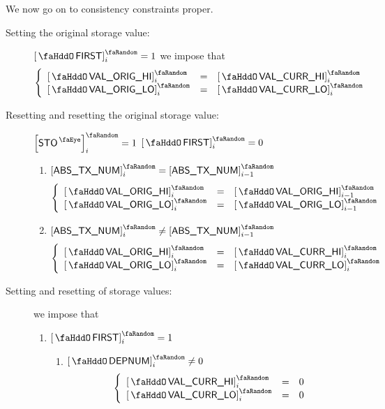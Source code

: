We now go on to consistency constraints proper.
\begin{description}
	\item[Setting the original storage value:]
		\If $\stoFirst_{i} = 1$ \Then
		we impose that
		\[
			\left\{ \begin{array}{lcl}
				\order{\stoOrigValueHi}_{i} & = & \order{\stoCurrValueHi}_{i} \\
				\order{\stoOrigValueLo}_{i} & = & \order{\stoCurrValueLo}_{i} \\
			\end{array} \right.
		\]
	\item[Resetting and resetting the original storage value:]
		\If $\order{\peekStorage}_{i} = 1$ \et $\stoFirst_{i} = 0$ \Then
		\begin{enumerate}
			\item \If $\order{\absTxNum}_{i} =    \order{\absTxNum}_{i - 1}$ \Then
				\[
					\left\{ \begin{array}{lcl}
						\order{\stoOrigValueHi}_{i} & = & \order{\stoOrigValueHi}_{i - 1} \\
						\order{\stoOrigValueLo}_{i} & = & \order{\stoOrigValueLo}_{i - 1} \\
					\end{array} \right.
				\]
			\item \If $\order{\absTxNum}_{i} \neq \order{\absTxNum}_{i - 1}$ \Then
				\[
					\left\{ \begin{array}{lcl}
						\order{\stoOrigValueHi}_{i} & = & \order{\stoCurrValueHi}_{i} \\
						\order{\stoOrigValueLo}_{i} & = & \order{\stoCurrValueLo}_{i} \\
					\end{array} \right.
				\]
		\end{enumerate}
	\item[Setting and resetting of storage values:]
		we impose that
		\begin{enumerate}
			\item \If $\stoFirst_{i} = 1$ \Then
				\begin{enumerate}
					\item \If $\order{\stoDeploymentNumber}_{i} \neq 0$ \Then
						\[
							\left\{ \begin{array}{lcl}
								\order{\stoCurrValueHi}_{i} & = & 0 \\
								\order{\stoCurrValueLo}_{i} & = & 0 \\
							\end{array} \right.
\]
\end{enumerate}
\end{enumerate}
\end{description}
